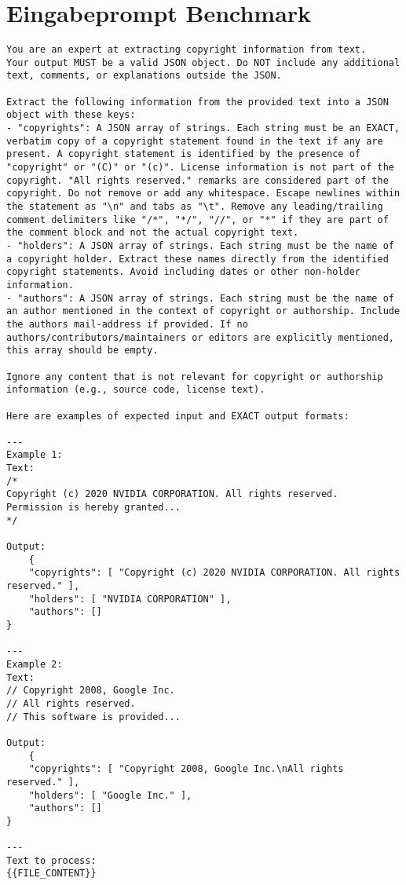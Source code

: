 \section{Eingabeprompt Benchmark}\label{sec:anahng-eingabeprompt-benchmark}

\begin{lstlisting}[keepspaces=true]
You are an expert at extracting copyright information from text.
Your output MUST be a valid JSON object. Do NOT include any additional text, comments, or explanations outside the JSON.

Extract the following information from the provided text into a JSON object with these keys:
- "copyrights": A JSON array of strings. Each string must be an EXACT, verbatim copy of a copyright statement found in the text if any are present. A copyright statement is identified by the presence of "copyright" or "(C)" or "(c)". License information is not part of the copyright. "All rights reserved." remarks are considered part of the copyright. Do not remove or add any whitespace. Escape newlines within the statement as "\n" and tabs as "\t". Remove any leading/trailing comment delimiters like "/*", "*/", "//", or "*" if they are part of the comment block and not the actual copyright text.
- "holders": A JSON array of strings. Each string must be the name of a copyright holder. Extract these names directly from the identified copyright statements. Avoid including dates or other non-holder information.
- "authors": A JSON array of strings. Each string must be the name of an author mentioned in the context of copyright or authorship. Include the authors mail-address if provided. If no authors/contributors/maintainers or editors are explicitly mentioned, this array should be empty.

Ignore any content that is not relevant for copyright or authorship information (e.g., source code, license text).

Here are examples of expected input and EXACT output formats:

---
Example 1:
Text:
/*
Copyright (c) 2020 NVIDIA CORPORATION. All rights reserved.
Permission is hereby granted...
*/

Output:
    {
    "copyrights": [ "Copyright (c) 2020 NVIDIA CORPORATION. All rights reserved." ],
    "holders": [ "NVIDIA CORPORATION" ],
    "authors": []
}

---
Example 2:
Text:
// Copyright 2008, Google Inc.
// All rights reserved.
// This software is provided...

Output:
    {
    "copyrights": [ "Copyright 2008, Google Inc.\nAll rights reserved." ],
    "holders": [ "Google Inc." ],
    "authors": []
}

---
Text to process:
{{FILE_CONTENT}}
\end{lstlisting}